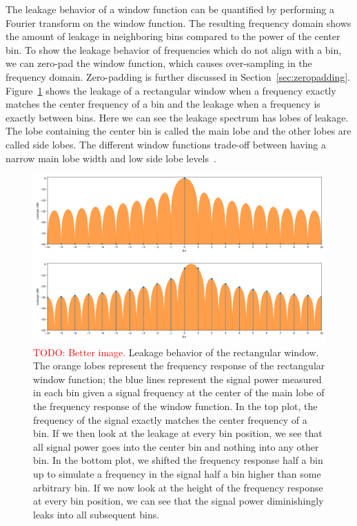 \documentclass[a4paper,10pt,twocolumn]{article}
\begin{document}
The leakage behavior of a window function can be quantified by performing a Fourier transform on the window function. The resulting frequency domain shows the amount of leakage in neighboring bins compared to the power of the center bin. To show the leakage behavior of frequencies which do not align with a bin, we can zero-pad the window function, which causes over-sampling in the frequency domain. Zero-padding is further discussed in Section~\ref{sec:zeropadding}. Figure~\ref{fig:winleak} shows the leakage of a rectangular window when a frequency exactly matches the center frequency of a bin and the leakage when a frequency is exactly between bins. Here we can see the leakage spectrum has lobes of leakage. The lobe containing the center bin is called the main lobe and the other lobes are called side lobes. The different window functions trade-off between having a narrow main lobe width and low side lobe levels~\cite{windowfunc}.
\begin{figure}[b]
    \centering
    \includegraphics[width=\linewidth]{fig/winleak.png}
    \caption{\textcolor{red}{TODO: Better image.} Leakage behavior of the rectangular window. The orange lobes represent the frequency response of the rectangular window function; the blue lines represent the signal power measured in each bin given a signal frequency at the center of the main lobe of the frequency response of the window function. In the top plot, the frequency of the signal exactly matches the center frequency of a bin. If we then look at the leakage at every bin position, we see that all signal power goes into the center bin and nothing into any other bin. In the bottom plot, we shifted the frequency response half a bin up to simulate a frequency in the signal half a bin higher than some arbitrary bin. If we now look at the height of the frequency response at every bin position, we can see that the signal power diminishingly leaks into all subsequent bins.}
    \label{fig:winleak}
\end{figure}
\end{document}
